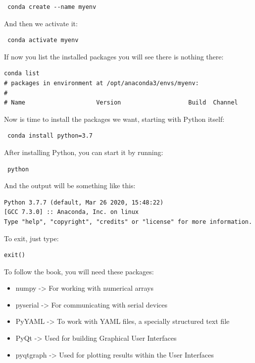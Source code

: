 \begin{verbatim}
 conda create --name myenv
\end{verbatim}

And then we activate it:

\begin{verbatim}
 conda activate myenv
\end{verbatim}

If now you list the installed packages you will see there is nothing there:

\begin{verbatim}
conda list
# packages in environment at /opt/anaconda3/envs/myenv:
#
# Name                    Version                   Build  Channel
\end{verbatim}

Now is time to install the packages we want, starting with Python itself:

\begin{verbatim}
 conda install python=3.7
\end{verbatim}


After installing Python, you can start it by running:

\begin{verbatim}
 python
\end{verbatim}

And the output will be something like this:

\begin{verbatim}
Python 3.7.7 (default, Mar 26 2020, 15:48:22)
[GCC 7.3.0] :: Anaconda, Inc. on linux
Type "help", "copyright", "credits" or "license" for more information.
\end{verbatim}

To exit, just type:

\begin{verbatim}
exit()
\end{verbatim}

To follow the book, you will need these packages:

\begin{itemize}
 \item numpy -> For working with numerical arrays
 \item pyserial -> For communicating with serial devices
 \item PyYAML -> To work with YAML files, a specially structured text file
 \item PyQt -> Used for building Graphical User Interfaces
 \item pyqtgraph -> Used for plotting results within the User Interfaces
\end{itemize}


